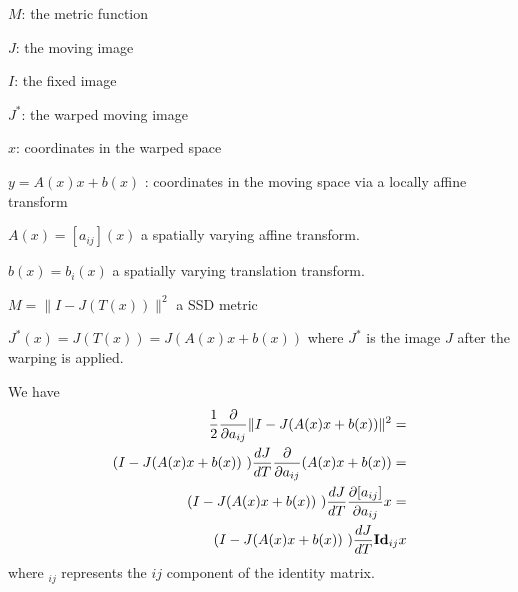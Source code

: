 \documentclass{article}
\begin{document}

\noindent $M$: the metric function \newline

\noindent $J$: the moving image \newline

\noindent $I$: the fixed image \newline

\noindent $J^{*}$: the warped moving image \newline

\noindent

\noindent $x$: coordinates in the warped space \newline

\noindent $y = A(x)x+b(x)$ : coordinates in the moving space via a
locally affine transform \newline

\noindent $A(x) = [ a_{ij} ] (x) $ a spatially varying affine
transform. \newline

\noindent $b(x) = b_{i} (x) $ a spatially varying translation
transform. \newline

\noindent

\noindent $ M =  \| I - J(T(x)) \|^2 $ a SSD metric \newline

\noindent$ J^*(x) = J(T(x)) = J(A(x)x+b(x))  $ where $J^*$ is the image
$J$ after the warping is applied. \newline

\noindent We have
\begin{eqnarray}
\frac{1}{2}\frac{\partial} {\partial a_{ij}} \| I - J (  A(x) x + b(x) ) \|^2 = \\ \notag
( I - J (  A(x) x + b(x))~) \frac{d J}{dT} \frac{\partial} {\partial
  a_{ij}}(  A(x) x + b(x) ) = \\ \notag
( I - J (  A(x) x + b(x))~) \frac{d J}{dT} \frac{\partial [a_{ij}]  } {\partial
  a_{ij}} x = \\ \notag
( I - J (  A(x) x + b(x))~) \frac{d J}{dT} \text{\bf{Id}}_{ij} x
\end{eqnarray}
where $_{ij}$ represents the $ij$ component of the
identity matrix.   \newline
\end{document}
